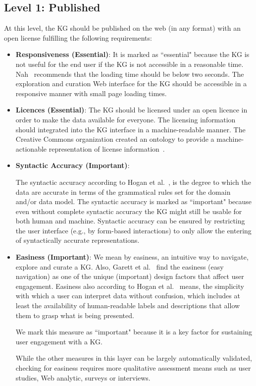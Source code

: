 \documentclass[runningheads]{llncs}
\begin{document}
\subsection{Level 1: Published}
At this level, the KG should be published on the web (in any format) with an open license fulfilling the following requirements: 
\begin{itemize}
  \item \textbf{Responsiveness (Essential)}: It is marked as ``essential" because the KG is not useful for the end user if the KG is not accessible in a reasonable time. Nah~\cite{nah_study_2004} recommends that the loading time should be below two seconds.
  The exploration and curation Web interface for the KG should be accessible in a responsive manner with small page loading times.
  
  \item \textbf {Licences (Essential)}: The KG should be licensed under an open licence in order to make the data available for everyone. The licensing information should integrated into the KG interface in a machine-readable manner. The Creative Commons organization created an ontology to provide a machine-actionable representation of license information~\cite{10.2307/j.ctt5vjsx3.16}.
  \item \textbf {Syntactic Accuracy (Important)}: 
  
  The syntactic accuracy according to Hogan et al.~\cite{hogan_knowledge_2022}, is the degree to which the data are accurate in terms of the grammatical rules set for the domain and/or data model. 
  The syntactic accuracy is marked as ``important" because even without complete syntactic accuracy the KG might still be usable for both human and machine.
  Syntactic accuracy can be ensured by restricting the user interface (e.g., by form-based interactions) to only allow the entering of syntactically accurate representations.
  
  \item \textbf {Easiness (Important)}: We mean by easiness, an intuitive way to navigate, explore and curate a KG. 
  Also, Garett et al.~\cite{garett_chiu_zhang_young_2016} find the easiness (easy navigation) as one of the unique (important) design factors that affect user engagement. 
  Easiness also according to Hogan et al.~\cite{hogan_empirical_2012} means, the simplicity with which a user can interpret data without confusion, which includes at least the availability of human-readable labels and descriptions that allow them to grasp what is being presented. 
  
  We mark this measure as ``important" because it is a key factor for sustaining user engagement with a KG.
  
  While the other measures in this layer can be largely automatically validated, checking for easiness requires more qualitative assessment means such as user studies, Web analytic, surveys or interviews.
\end{itemize}
\end{document}
